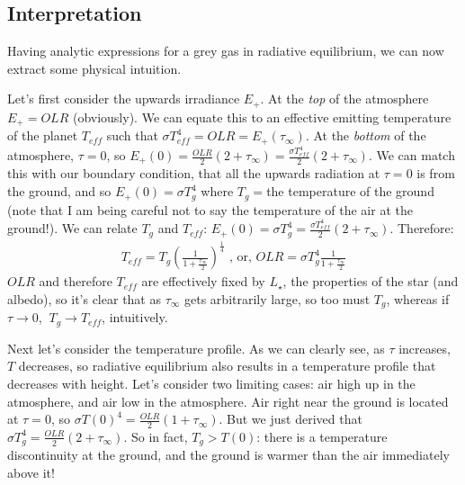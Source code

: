 \subsection{Interpretation}

Having analytic expressions for a grey gas in radiative equilibrium, we can now extract some physical intuition. 

Let's first consider the upwards irradiance $E_+$. At the \textit{top} of the atmosphere $E_+=OLR$ (obviously). We can equate this to an effective emitting temperature of the planet $T_{eff}$ such that $\sigma T_{eff}^4=OLR=E_+(\tau_\infty)$. At the \textit{bottom} of the atmosphere, $\tau=0$, so $E_+(0)=\frac{OLR}{2}(2+\tau_\infty)=\frac{\sigma T_{eff}^4}{2}(2+\tau_\infty)$. We can match this with our boundary condition, that all the upwards radiation at $\tau=0$ is from the ground, and so $E_+(0)=\sigma T_g^4$ where $T_g=$the temperature of the ground (note that I am being careful not to say the temperature of the air at the ground!). We can relate $T_g$ and $T_{eff}$: $E_+(0)=\sigma T_{g}^4=\frac{\sigma T_{eff}^4}{2}(2+\tau_\infty)$. Therefore:
\begin{align*}
    T_{eff}=T_{g}\left(\frac{1}{1+\frac{\tau_\infty}{2}}\right)^\frac{1}{4} \,\,\text{, or,}\,\,
    OLR=\sigma T_g^4\frac{1}{1+\frac{\tau_\infty}{2}}
\end{align*}
$OLR$ and therefore $T_{eff}$ are effectively fixed by $L_\star$, the properties of the star (and albedo), so it's clear that as $\tau_\infty$ gets arbitrarily large, so too must $T_g$, whereas if $\tau\to0$, $\ T_g\to T_{eff}$, intuitively.

Next let's consider the temperature profile. As we can clearly see, as $\tau$ increases, $T$ decreases, so radiative equilibrium also results in a temperature profile that decreases with height. Let's consider two limiting cases: air high up in the atmosphere, and air low in the atmosphere. Air right near the ground is located at $\tau=0$, so $\sigma T(0)^4=\frac{OLR}{2}(1+\tau_\infty)$. But we just derived that $\sigma T_g^4=\frac{OLR}{2}(2+\tau_\infty)$. So in fact, $T_g>T(0)$: there is a temperature discontinuity at the ground, and the ground is warmer than the air immediately above it! 

